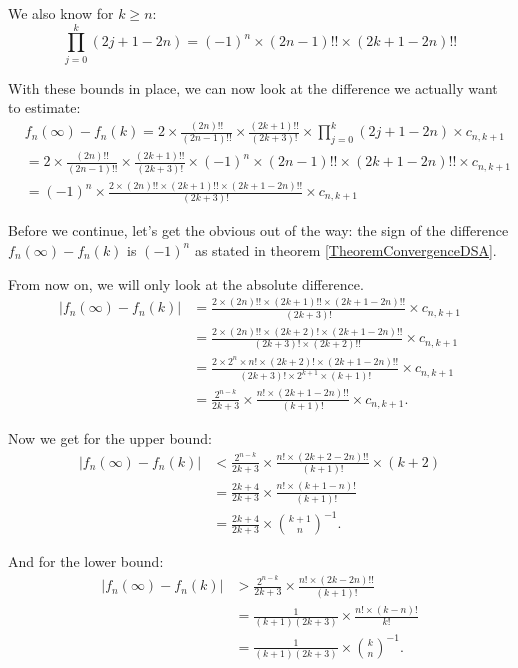 \documentclass[a4paper,11pt]{scrartcl}
\theoremstyle{definition}
\theoremstyle{plain}
\theoremstyle{remark}
\begin{document}
We also know for $k \geq n$:
\[
\prod_{j=0}^{k}(2j + 1 - 2n) = (-1)^n \times (2n-1)!! \times (2k+1-2n)!!
\]

With these bounds in place, we can now look at the difference we actually want to estimate:
\begin{align*}
&f_n(\infty) - f_n(k)
= 2 \times \frac{(2n)!!}{(2n-1)!!} \times \frac{(2k+1)!!}{(2k+3)!} \times \prod_{j=0}^{k}(2j + 1 - 2n) \times c_{n,k+1} \\
&= 2 \times \frac{(2n)!!}{(2n-1)!!} \times \frac{(2k+1)!!}{(2k+3)!} \times (-1)^n \times (2n-1)!! \times (2k+1-2n)!! \times c_{n,k+1} \\
&= (-1)^n \times \frac{2 \times (2n)!! \times (2k+1)!! \times (2k+1-2n)!!}{(2k+3)!} \times  c_{n,k+1}
\end{align*}

Before we continue, let's get the obvious out of the way:
the sign of the difference $f_n(\infty) - f_n(k)$ is $(-1)^n$ as stated in theorem \ref{TheoremConvergenceDSA}.

From now on, we will only look at the absolute difference.
\begin{align*}
|f_n(\infty) - f_n(k)|
&= \frac{2 \times (2n)!! \times (2k+1)!! \times (2k+1-2n)!!}{(2k+3)!} \times  c_{n,k+1} \\
&= \frac{2 \times (2n)!! \times (2k+2)! \times (2k+1-2n)!!}{(2k+3)! \times (2k+2)!!} \times  c_{n,k+1} \\
&= \frac{2 \times 2^n \times n! \times (2k+2)! \times (2k+1-2n)!!}{(2k+3)! \times 2^{k+1} \times (k+1)!} \times  c_{n,k+1} \\
&= \frac{2^{n-k}}{2k+3} \times \frac{n! \times (2k+1-2n)!!}{(k+1)!} \times  c_{n,k+1}.
\end{align*}

Now we get for the upper bound:
\begin{align*}
|f_n(\infty) - f_n(k)|
& < \frac{2^{n-k}}{2k+3} \times \frac{n! \times (2k+2-2n)!!}{(k+1)!} \times  (k+2) \\
& = \frac{2k+4}{2k+3} \times \frac{n! \times (k+1-n)!}{(k+1)!} \\
& = \frac{2k+4}{2k+3} \times \binom{k+1}{n}^{-1}.
\end{align*}

And for the lower bound:
\begin{align*}
|f_n(\infty) - f_n(k)|
& > \frac{2^{n-k}}{2k+3} \times \frac{n! \times (2k-2n)!!}{(k+1)!} \\
& = \frac{1}{(k+1)(2k+3)} \times \frac{n! \times (k-n)!}{k!} \\
& = \frac{1}{(k+1)(2k+3)} \times \binom{k}{n}^{-1}.
\end{align*}
\end{document}
